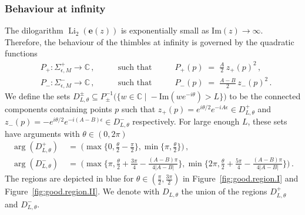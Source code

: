 \documentclass[12pt,reqno]{amsart}
\theoremstyle{definition}
\def\BC{\mathbb C}
\def\Im{\mathrm{Im}}
\def\be{\begin{equation}}
\def\ee{\end{equation}}
\def\e{\mathbf e}
\renewcommand{\=}{\;=\;}
\newcommand{\Li}{\operatorname{Li}}
\begin{document}
\subsubsection{Behaviour at infinity}
The dilogarithm $\Li_{2}(\e(z))$ is exponentially small as $\Im(z)\to\infty$. Therefore, the behaviour of the thimbles at infinity is governed by the quadratic functions
\be
\begin{aligned}
  &P_{+}:\Sigma_{\epsilon,M}^{+}\rightarrow\BC\,,
  &\qquad\text{such that}\qquad&
  P_{+}(p)\=\frac{A}{2}\,z_{+}(p)^2\,,\\
  &P_{-}:\Sigma_{\epsilon,M}^{-}\rightarrow\BC\,,
  &\qquad\text{such that}\qquad&
  P_{-}(p)\=\frac{A-B}{2}\,z_{-}(p)^2\,.
\end{aligned}
\ee
We define the sets $D_{L,\theta}^{\pm}\subseteq P_{\pm}^{-1}\big(\{w\in\BC\;|\;-\Im(we^{-i\theta})>L\}\big)$ to be the connected components containing points $p$ such that $z_{+}(p)=e^{i\theta/2}e^{-iA\epsilon}\in D_{L,\theta}^{+}$ and $z_{-}(p)=-e^{i\theta/2}e^{-i(A-B)\epsilon}\in D_{L,\theta}^{-}$ respectively. For large enough $L$, these sets have arguments with $\theta\in(0,2\pi)$
\be\label{eq:D.angles}
\begin{aligned}
  \arg(D_{L,\theta}^{+})
  &\=
  \Big(\max\big\{0,\tfrac{\theta}{2}-\tfrac{\pi}{2}\big\},\min\big\{\pi,\tfrac{\theta}{2}\big\}\Big)\,,\\
  \arg(D_{L,\theta}^{-})
  &\=
  \Big(\max\big\{\pi,\tfrac{\theta}{2}+\tfrac{3\pi}{4}-\tfrac{(A-B)\pi}{4|A-B|}\big\},\min\big\{2\pi,\tfrac{\theta}{2}+\tfrac{5\pi}{4}-\tfrac{(A-B)\pi}{4|A-B|}\big\}\Big)\,.
\end{aligned}
\ee
The regions are depicted in blue for $\theta\in(\tfrac{\pi}{2},\tfrac{3\pi}{2})$ in Figure~\ref{fig:good.region.I} and Figure~\ref{fig:good.region.II}.
We denote with $D_{L,\theta}$ the union of the regions $D_{L,\theta}^+$ and $D_{L,\theta}^{-}$.
\end{document}
